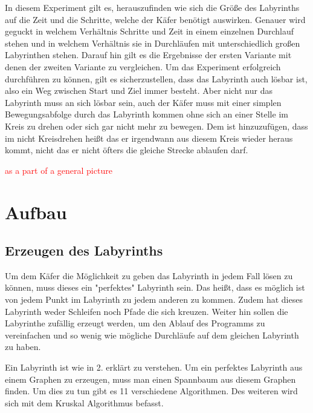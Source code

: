 \documentclass[11pt, a4paper]{article}
\newif\ifproofread
\newcommand{\changemarker}[1]{%
\ifproofread
\textcolor{red}{#1}%
\else
#1%
\fi
}
\begin{document}
In diesem Experiment gilt es, herauszufinden wie sich die Größe des Labyrinths auf die Zeit und die Schritte, welche der Käfer benötigt auswirken. Genauer wird geguckt in welchem Verhältnis Schritte und Zeit in einem einzelnen Durchlauf stehen und in welchem Verhältnis sie in Durchläufen mit unterschiedlich großen Labyrinthen stehen. Darauf hin gilt es die Ergebnisse der ersten Variante mit denen der zweiten Variante zu vergleichen. Um das Experiment erfolgreich durchführen zu können, gilt es sicherzustellen, dass das Labyrinth auch lösbar ist, also ein Weg zwischen Start und Ziel immer besteht. Aber nicht nur das Labyrinth muss an sich lösbar sein, auch der Käfer muss mit einer simplen Bewegungsabfolge durch das Labyrinth kommen ohne sich an einer Stelle im Kreis zu drehen oder sich gar nicht mehr zu bewegen. Dem ist hinzuzufügen, dass im nicht Kreisdrehen heißt das er irgendwann aus diesem Kreis wieder heraus kommt, nicht das er nicht öfters die gleiche Strecke ablaufen darf.

\bigskip

\proofreadtrue

\changemarker{as a part of a general picture}

\proofreadfalse

\newpage

\section{Aufbau}

\subsection{Erzeugen des Labyrinths}

Um dem Käfer die Möglichkeit zu geben das Labyrinth in jedem Fall lösen zu können, muss dieses ein "perfektes" Labyrinth sein. Das heißt, dass es möglich ist von jedem Punkt im Labyrinth zu jedem anderen zu kommen. Zudem hat dieses Labyrinth weder Schleifen noch Pfade die sich kreuzen. Weiter hin sollen die Labyrinthe zufällig erzeugt werden, um den Ablauf des Programms zu vereinfachen und so wenig wie mögliche Durchläufe auf dem gleichen Labyrinth zu haben.

\bigskip

Ein Labyrinth ist wie in 2. erklärt zu verstehen. Um ein perfektes Labyrinth aus einem Graphen zu erzeugen, muss man einen Spannbaum aus diesem Graphen finden. Um dies zu tun gibt es 11 verschiedene Algorithmen. Des weiteren wird sich mit dem Kruskal Algorithmus befasst. 
\end{document}

